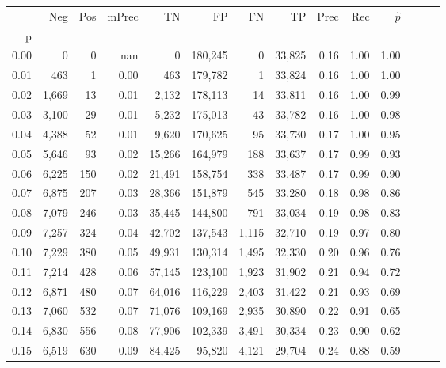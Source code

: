 \begin{tabular}{rrrrrrrrrrrrrr}
\toprule
{} &    Neg &  Pos & mPrec &       TN &       FP &      FN &      TP &  Prec &   Rec & $\hat{p}$ \\
p    &        &      &       &          &          &         &         &       &       &           \\
\midrule
0.00 &      0 &    0 &   nan &        0 &  180,245 &       0 &  33,825 &  0.16 &  1.00 &      1.00 \\
0.01 &    463 &    1 &  0.00 &      463 &  179,782 &       1 &  33,824 &  0.16 &  1.00 &      1.00 \\
0.02 &  1,669 &   13 &  0.01 &    2,132 &  178,113 &      14 &  33,811 &  0.16 &  1.00 &      0.99 \\
0.03 &  3,100 &   29 &  0.01 &    5,232 &  175,013 &      43 &  33,782 &  0.16 &  1.00 &      0.98 \\
0.04 &  4,388 &   52 &  0.01 &    9,620 &  170,625 &      95 &  33,730 &  0.17 &  1.00 &      0.95 \\
0.05 &  5,646 &   93 &  0.02 &   15,266 &  164,979 &     188 &  33,637 &  0.17 &  0.99 &      0.93 \\
0.06 &  6,225 &  150 &  0.02 &   21,491 &  158,754 &     338 &  33,487 &  0.17 &  0.99 &      0.90 \\
0.07 &  6,875 &  207 &  0.03 &   28,366 &  151,879 &     545 &  33,280 &  0.18 &  0.98 &      0.86 \\
0.08 &  7,079 &  246 &  0.03 &   35,445 &  144,800 &     791 &  33,034 &  0.19 &  0.98 &      0.83 \\
0.09 &  7,257 &  324 &  0.04 &   42,702 &  137,543 &   1,115 &  32,710 &  0.19 &  0.97 &      0.80 \\
0.10 &  7,229 &  380 &  0.05 &   49,931 &  130,314 &   1,495 &  32,330 &  0.20 &  0.96 &      0.76 \\
0.11 &  7,214 &  428 &  0.06 &   57,145 &  123,100 &   1,923 &  31,902 &  0.21 &  0.94 &      0.72 \\
0.12 &  6,871 &  480 &  0.07 &   64,016 &  116,229 &   2,403 &  31,422 &  0.21 &  0.93 &      0.69 \\
0.13 &  7,060 &  532 &  0.07 &   71,076 &  109,169 &   2,935 &  30,890 &  0.22 &  0.91 &      0.65 \\
0.14 &  6,830 &  556 &  0.08 &   77,906 &  102,339 &   3,491 &  30,334 &  0.23 &  0.90 &      0.62 \\
0.15 &  6,519 &  630 &  0.09 &   84,425 &   95,820 &   4,121 &  29,704 &  0.24 &  0.88 &      0.59 \\

\end{tabular}
